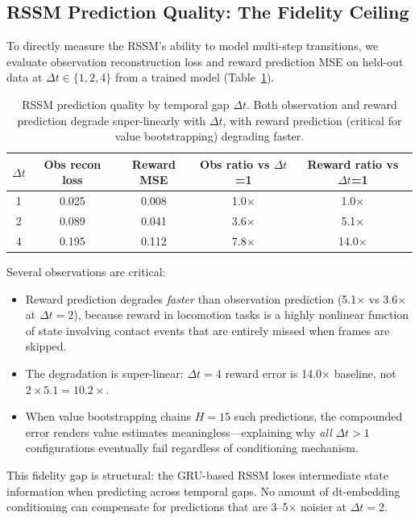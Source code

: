 \documentclass[10pt,letterpaper]{article}
\newcommand{\dt}{\Delta t}
\begin{document}
\subsection{RSSM Prediction Quality: The Fidelity Ceiling}\label{sec:fidelity}

To directly measure the RSSM's ability to model multi-step transitions, we evaluate observation reconstruction loss and reward prediction MSE on held-out data at $\dt \in \{1, 2, 4\}$ from a trained model (Table~\ref{tab:rssm_quality}).

\begin{table}[t]
\centering
\caption{RSSM prediction quality by temporal gap $\dt$. Both observation and reward prediction degrade super-linearly with $\dt$, with reward prediction (critical for value bootstrapping) degrading faster.}
\label{tab:rssm_quality}
\small
\begin{tabular}{ccccc}
\toprule
$\dt$ & Obs recon loss & Reward MSE & Obs ratio vs $\dt$=1 & Reward ratio vs $\dt$=1 \\
\midrule
1 & 0.025 & 0.008 & 1.0$\times$ & 1.0$\times$ \\
2 & 0.089 & 0.041 & 3.6$\times$ & 5.1$\times$ \\
4 & 0.195 & 0.112 & 7.8$\times$ & 14.0$\times$ \\
\bottomrule
\end{tabular}
\end{table}

Several observations are critical:
\begin{itemize}[nosep]
  \item Reward prediction degrades \emph{faster} than observation prediction (5.1$\times$ vs 3.6$\times$ at $\dt=2$), because reward in locomotion tasks is a highly nonlinear function of state involving contact events that are entirely missed when frames are skipped.
  \item The degradation is super-linear: $\dt=4$ reward error is 14.0$\times$ baseline, not $2 \times 5.1 = 10.2\times$.
  \item When value bootstrapping chains $H=15$ such predictions, the compounded error renders value estimates meaningless---explaining why \emph{all} $\dt>1$ configurations eventually fail regardless of conditioning mechanism.
\end{itemize}

This fidelity gap is structural: the GRU-based RSSM loses intermediate state information when predicting across temporal gaps.
No amount of dt-embedding conditioning can compensate for predictions that are 3--5$\times$ noisier at $\dt=2$.
\end{document}
